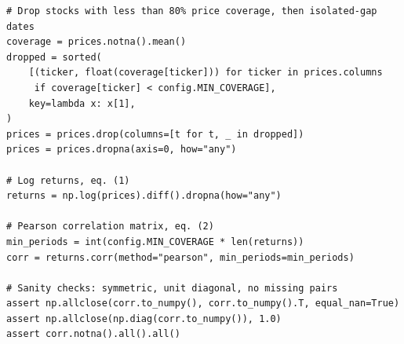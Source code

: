 \begin{lstlisting}[style=python]
# Drop stocks with less than 80% price coverage, then isolated-gap dates
coverage = prices.notna().mean()
dropped = sorted(
    [(ticker, float(coverage[ticker])) for ticker in prices.columns
     if coverage[ticker] < config.MIN_COVERAGE],
    key=lambda x: x[1],
)
prices = prices.drop(columns=[t for t, _ in dropped])
prices = prices.dropna(axis=0, how="any")

# Log returns, eq. (1)
returns = np.log(prices).diff().dropna(how="any")

# Pearson correlation matrix, eq. (2)
min_periods = int(config.MIN_COVERAGE * len(returns))
corr = returns.corr(method="pearson", min_periods=min_periods)

# Sanity checks: symmetric, unit diagonal, no missing pairs
assert np.allclose(corr.to_numpy(), corr.to_numpy().T, equal_nan=True)
assert np.allclose(np.diag(corr.to_numpy()), 1.0)
assert corr.notna().all().all()
\end{lstlisting}
